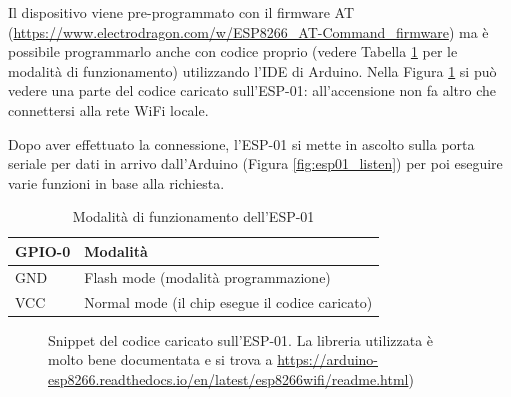 \documentclass[12pt]{report}
\begin{document}
Il dispositivo viene pre-programmato con il firmware AT  (\url{https://www.electrodragon.com/w/ESP8266\_AT-Command\_firmware}) ma è possibile programmarlo anche con codice proprio (vedere Tabella \ref{tab:esp01_modes} per le modalità di funzionamento) utilizzando l'IDE di Arduino. Nella Figura \ref{fig:esp01_flashed_code} si può vedere una parte del codice caricato sull'ESP-01: all'accensione non fa altro che connettersi alla rete WiFi locale.

Dopo aver effettuato la connessione, l'ESP-01 si mette in ascolto sulla porta seriale per dati in arrivo dall'Arduino (Figura \ref{fig:esp01_listen}) per poi eseguire varie funzioni in base alla richiesta.


\begin{table}[h!]
	\begin{center}
		\begin{tabular}{l|l} 
			\textbf{GPIO-0} & \textbf{Modalità} \\
			\hline
			GND & Flash mode (modalità programmazione) \\
			VCC & Normal mode (il chip esegue il codice caricato) \\
		\end{tabular}
		\caption{Modalità di funzionamento dell'ESP-01}
		\label{tab:esp01_modes}
	\end{center}
\end{table}

\begin{figure}
	\caption{Snippet del codice caricato sull'ESP-01. La libreria utilizzata è molto bene documentata e si trova a \url{https://arduino-esp8266.readthedocs.io/en/latest/esp8266wifi/readme.html})}
	\label{fig:esp01_flashed_code}
\end{figure}
\end{document}
